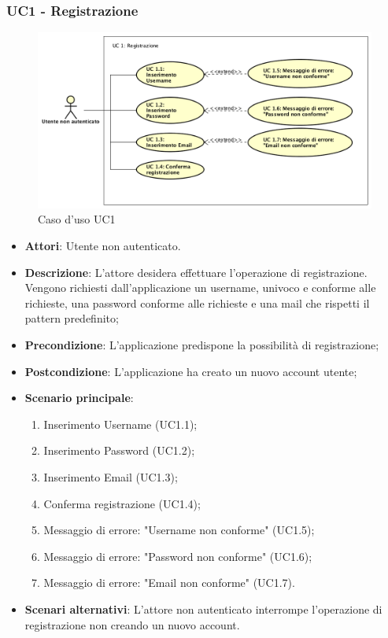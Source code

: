 \subsubsection{UC1 - Registrazione} 
\label{sssec:UC1} 
\begin{figure}[h!] 
\centering 
\includegraphics[scale=0.3]{Casi D'uso/UC1.png} 
\caption{Caso d'uso UC1} 
 \end{figure} 
\begin{itemize} 
\item \textbf{Attori}: Utente non autenticato.
\item \textbf{Descrizione}: L'attore desidera effettuare l'operazione di registrazione. Vengono richiesti dall'applicazione un username, univoco e conforme alle richieste, una password conforme alle richieste e una mail che rispetti il pattern predefinito;
\item \textbf{Precondizione}: L'applicazione predispone la possibilità di registrazione;
\item \textbf{Postcondizione}: L'applicazione ha creato un nuovo account utente;
\item \textbf{Scenario principale}: \begin{enumerate}\item Inserimento Username (UC1.1);\item Inserimento Password (UC1.2);\item Inserimento Email (UC1.3);\item Conferma registrazione (UC1.4);\item Messaggio di errore: "Username non conforme" (UC1.5);\item Messaggio di errore: "Password non conforme" (UC1.6);\item Messaggio di errore: "Email non conforme" (UC1.7). 
 \end{enumerate}
\item \textbf{Scenari alternativi}: L’attore non autenticato interrompe l’operazione di registrazione non creando un nuovo account.
\end{itemize} 
